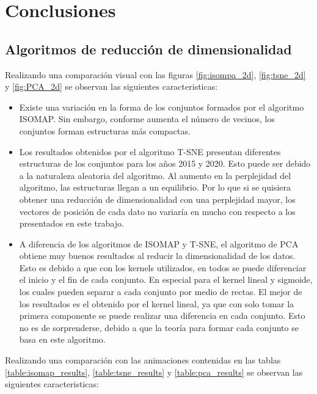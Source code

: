 \section{Conclusiones}

\subsection{Algoritmos de reducción de dimensionalidad}

Realizando una comparación visual con las figuras \ref{fig:isompa_2d}, \ref{fig:tsne_2d} y \ref{fig:PCA_2d} se observan las siguientes caracteristicas:

\begin{itemize}
    \item Existe una variación en la forma de los conjuntos formados por el algoritmo ISOMAP. Sin embargo, conforme aumenta el número de vecinos, los conjuntos forman estructuras más compactas.
    \item Los resultados obtenidos por el algoritmo T-SNE presentan diferentes estructuras de los conjuntos para los años 2015 y 2020. Esto puede ser debido a la naturaleza aleatoria del algoritmo. Al aumento en la perplejidad del algoritmo, las estructuras llegan a un equilibrio. Por lo que si se quisiera obtener una reducción de dimensionalidad con una perplejidad mayor, los vectores de posición de cada dato no variaría en mucho con respecto a los presentados en este trabajo.
    \item A diferencia de los algoritmos de ISOMAP y T-SNE, el algoritmo de PCA obtiene muy buenos resultados al reducir la dimensionalidad de los datos. Esto es debido a que con los kernels utilizados, en todos se puede diferenciar el inicio y el fin de cada conjunto. En especial para el kernel lineal y sigmoide, los cuales pueden separar a cada conjunto por medio de rectas. El mejor de los resultados es el obtenido por el kernel lineal, ya que con solo tomar la primera componente se puede realizar una diferencia en cada conjunto. Esto no es de sorprenderse, debido a que la teoría para formar cada conjunto se basa en este algoritmo.
\end{itemize}

Realizando una comparación con las animaciones contenidas en las tablas \ref{table:isomap_results}, \ref{table:tsne_results} y \ref{table:pca_results} se observan las siguientes caracteristicas:

